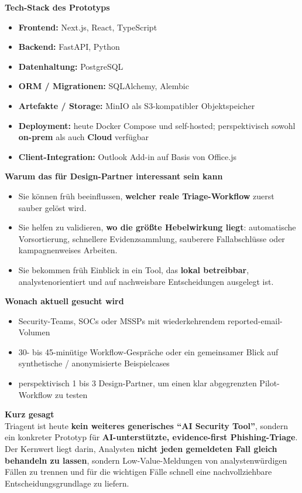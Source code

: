 \documentclass[10pt,a4paper]{article}
\begin{document}
\noindent\textbf{Tech-Stack des Prototyps}
\begin{itemize}
  \item \textbf{Frontend:} Next.js, React, TypeScript
  \item \textbf{Backend:} FastAPI, Python
  \item \textbf{Datenhaltung:} PostgreSQL
  \item \textbf{ORM / Migrationen:} SQLAlchemy, Alembic
  \item \textbf{Artefakte / Storage:} MinIO als S3-kompatibler Objektspeicher
  \item \textbf{Deployment:} heute Docker Compose und self-hosted; perspektivisch sowohl \textbf{on-prem} als auch \textbf{Cloud} verfügbar
  \item \textbf{Client-Integration:} Outlook Add-in auf Basis von Office.js
\end{itemize}

\noindent\textbf{Warum das für Design-Partner interessant sein kann}
\begin{itemize}
  \item Sie können früh beeinflussen, \textbf{welcher reale Triage-Workflow} zuerst sauber gelöst wird.
  \item Sie helfen zu validieren, \textbf{wo die größte Hebelwirkung liegt}: automatische Vorsortierung, schnellere Evidenzsammlung, sauberere Fallabschlüsse oder kampagnenweises Arbeiten.
  \item Sie bekommen früh Einblick in ein Tool, das \textbf{lokal betreibbar}, analystenorientiert und auf nachweisbare Entscheidungen ausgelegt ist.
\end{itemize}

\noindent\textbf{Wonach aktuell gesucht wird}
\begin{itemize}
  \item Security-Teams, SOCs oder MSSPs mit wiederkehrendem reported-email-Volumen
  \item 30- bis 45-minütige Workflow-Gespräche oder ein gemeinsamer Blick auf synthetische / anonymisierte Beispielcases
  \item perspektivisch 1 bis 3 Design-Partner, um einen klar abgegrenzten Pilot-Workflow zu testen
\end{itemize}

\noindent\textbf{Kurz gesagt}\\
Triagent ist heute \textbf{kein weiteres generisches ``AI Security Tool''}, sondern ein konkreter Prototyp für \textbf{AI-unterstützte, evidence-first Phishing-Triage}. Der Kernwert liegt darin, Analysten \textbf{nicht jeden gemeldeten Fall gleich behandeln zu lassen}, sondern Low-Value-Meldungen von analystenwürdigen Fällen zu trennen und für die wichtigen Fälle schnell eine nachvollziehbare Entscheidungsgrundlage zu liefern.
\end{document}
